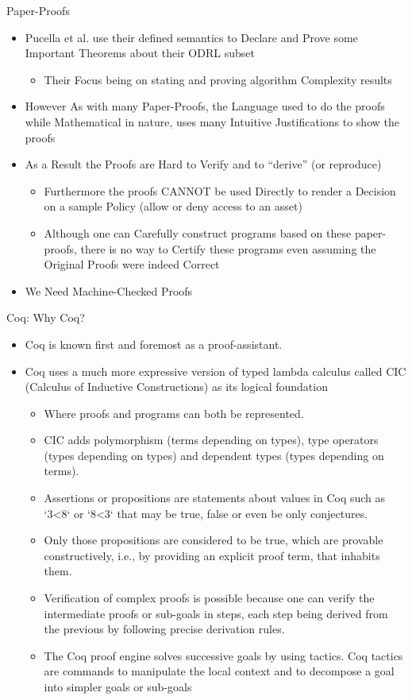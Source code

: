 \documentclass{beamer}
\begin{document}
\begin{frame}[fragile]{Paper-Proofs}
\begin{itemize}
\item Pucella et al. use their defined semantics to Declare and Prove some Important Theorems about their ODRL subset
\begin{itemize}
\item Their Focus being on stating and proving algorithm Complexity results
\end{itemize}
\item However As with many Paper-Proofs, the Language used to do the proofs while Mathematical in nature, uses many Intuitive Justifications to show the proofs
\item As a Result the Proofs are Hard to Verify and to ``derive'' (or reproduce)
\begin{itemize}
\item Furthermore the proofs CANNOT be used Directly to render a Decision on a sample Policy (allow or deny access to an asset)
\item Although one can Carefully construct programs based on these paper-proofs, there is no way to Certify these programs even assuming the Original Proofs were indeed Correct
\end{itemize}
\item We Need Machine-Checked Proofs
\end{itemize}
\end{frame}
\begin{frame}[fragile]{Coq: Why Coq?}
\small
\begin{itemize}
\item Coq is known first and foremost as a proof-assistant.
\item Coq uses a much more expressive version of typed lambda calculus called CIC (Calculus of Inductive Constructions) as its logical foundation
    \begin{itemize}
       \item Where proofs and programs can both be represented.
       \item CIC adds polymorphism (terms depending on types), type operators (types depending on types) and dependent types (types depending on terms).
       \item Assertions or propositions are statements about values in Coq such as `3<8` or `8<3` that may be true, false or even be only conjectures. 
       \item Only those propositions are considered to be true, which are provable constructively, i.e., by providing an explicit proof term, that inhabits them.
       \item Verification of complex proofs is possible because one can verify the intermediate proofs or sub-goals in steps, each step being derived from the previous by following precise derivation rules. 
       \item The Coq proof engine solves successive goals by using tactics. Coq tactics are commands to manipulate the local context and to decompose a goal into simpler goals or sub-goals
   \end{itemize}
\end{itemize}
\end{frame}
\end{document}
